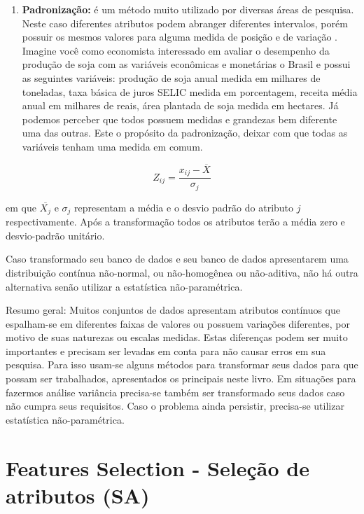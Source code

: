 \documentclass[
  openany]{book}
\providecommand{\tightlist}{%
  \setlength{\itemsep}{0pt}\setlength{\parskip}{0pt}}
\begin{document}
\begin{enumerate}
\def\labelenumi{\arabic{enumi}.}
\setcounter{enumi}{4}
\tightlist
\item
  \textbf{Padronização:} é um método muito utilizado por diversas áreas de pesquisa. Neste caso diferentes atributos podem abranger diferentes intervalos, porém possuir os mesmos valores para alguma medida de posição e de variação \citep{carvalho2011inteligencia}. Imagine você como economista interessado em avaliar o desempenho da produção de soja com as variáveis econômicas e monetárias o Brasil e possui as seguintes variáveis: produção de soja anual medida em milhares de toneladas, taxa básica de juros SELIC medida em porcentagem, receita média anual em milhares de reais, área plantada de soja medida em hectares. Já podemos perceber que todos possuem medidas e grandezas bem diferente uma das outras. Este o propósito da padronização, deixar com que todas as variáveis tenham uma medida em comum.
\end{enumerate}

\begin{equation}
Z_{ij}=\frac{x_{ij}-\overline{X}}{\sigma_j}
\label{eq:padronizacao}
\end{equation}

em que \(\overline{X_j}\) e \(\sigma_j\) representam a média e o desvio padrão do atributo \(j\) respectivamente. Após a transformação todos os atributos terão a média zero e desvio-padrão unitário.

Caso transformado seu banco de dados e seu banco de dados apresentarem uma distribuição contínua não-normal, ou não-homogênea ou não-aditiva, não há outra alternativa senão utilizar a estatística não-paramétrica.

Resumo geral: Muitos conjuntos de dados apresentam atributos contínuos que espalham-se em diferentes faixas de valores ou possuem variações diferentes, por motivo de suas naturezas ou escalas medidas. Estas diferenças podem ser muito importantes e precisam ser levadas em conta para não causar erros em sua pesquisa. Para isso usam-se alguns métodos para transformar seus dados para que possam ser trabalhados, apresentados os principais neste livro. Em situações para fazermos análise variância precisa-se também ser transformado seus dados caso não cumpra seus requisitos. Caso o problema ainda persistir, precisa-se utilizar estatística não-paramétrica.

\hypertarget{features-selection---seleuxe7uxe3o-de-atributos-sa}{%
\section{Features Selection - Seleção de atributos (SA)}\label{features-selection---seleuxe7uxe3o-de-atributos-sa}}
\end{document}
